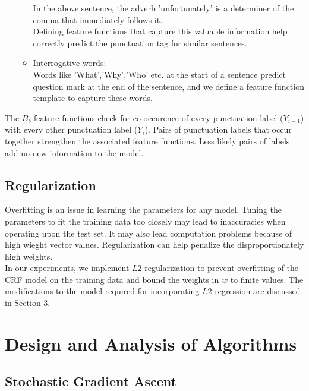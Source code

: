 \documentclass[11pt,a4paper,oneside]{article}
\begin{document}
\begin{enumerate}
\begin{itemize}
In the above sentence, the adverb 'unfortunately' is a determiner of the comma that immediately follows it.\\

Defining feature functions that capture this valuable information help correctly predict the punctuation tag for similar sentences.\\

\item{Interrogative words:}\\

Words like 'What','Why','Who' etc. at the start of a sentence predict question mark at the end of the sentence, and we define a feature function template to capture these words.

\end{itemize}
\end{enumerate}

The $B_b$ feature functions check for co-occurence of every punctuation label ($Y_{i-1}$) with every other punctuation label ($Y_{i}$). Pairs of punctuation labels that occur together strengthen the associated feature functions. Less likely pairs of labels add no new information to the model.

\subsection{Regularization}

Overfitting is an issue in learning the parameters for any model. Tuning the parameters to fit the training data too closely may lead to inaccuracies when operating upon the test set. It may also lead computation problems because of high wieght vector values. Regularization can help penalize the disproportionately high weights.\\

In our experiments, we implement $L2$ regularization to prevent overfitting of the CRF model on the training data and bound the weights in $w$ to finite values. The modifications to the model required for incorporating $L2$ regression are discussed in Section 3.

\section{Design and Analysis of Algorithms}

\label{sec:Algorithms}

\subsection{Stochastic Gradient Ascent}
\end{document}

